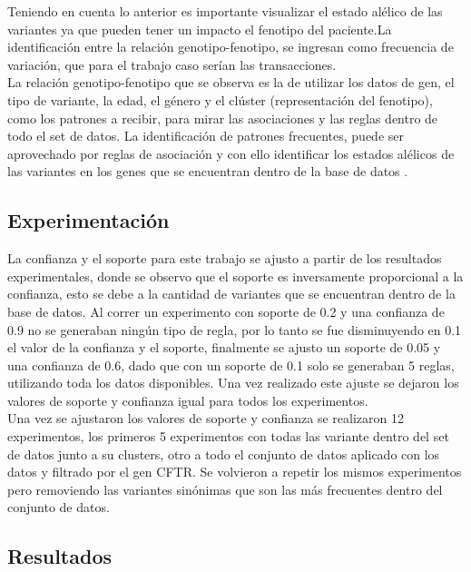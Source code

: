 Teniendo en cuenta lo anterior es importante visualizar el estado alélico de las variantes \cite{Hannah-Shmouni2015,Laboratories2015} ya que pueden tener un impacto el fenotipo del paciente.La identificación entre la relación genotipo-fenotipo, se ingresan como frecuencia de variación, que para el trabajo caso serían las transacciones\cite{Breuer2017}.\\

La relación genotipo-fenotipo que se observa es  la de utilizar los datos de gen, el tipo de variante, la edad, el género y el clúster (representación del fenotipo), como los patrones a recibir, para mirar las asociaciones y las reglas dentro de todo el set de datos. La identificación de patrones frecuentes, puede ser aprovechado por reglas de asociación y con ello identificar los estados alélicos de las variantes en los genes que se encuentran dentro de la base de datos \cite{breuler2017}.\\

\subsection{Experimentación}

La confianza y el soporte para este trabajo se ajusto a partir de los resultados experimentales, donde se observo que el soporte es inversamente proporcional a la confianza, esto se debe a la cantidad de variantes que se encuentran dentro de la base de datos. Al correr un experimento con soporte de 0.2 y una confianza de 0.9 no se generaban ningún tipo de regla, por lo tanto se fue disminuyendo en 0.1 el valor de la confianza y el soporte, finalmente se ajusto un soporte de 0.05 y una confianza de 0.6, dado que con un soporte de 0.1 solo se generaban 5 reglas, utilizando toda los datos disponibles. Una vez realizado este ajuste se dejaron los valores de soporte y confianza igual para todos los experimentos.\\

Una vez se ajustaron los valores de soporte y confianza se realizaron 12 experimentos, los primeros 5 experimentos con todas las variante dentro del set de datos junto a su clusters, otro a todo el conjunto de datos aplicado con los datos y filtrado por el gen CFTR. Se volvieron a repetir los mismos experimentos pero removiendo las variantes sinónimas que son las más frecuentes dentro del conjunto de datos.


\subsection{Resultados} 

